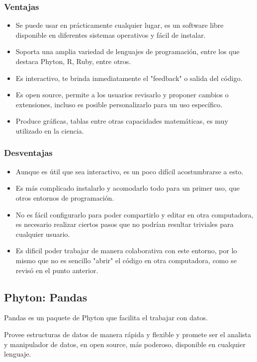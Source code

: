 \documentclass[a4paper]{article}
\begin{document}
\subsubsection{Ventajas}
\begin{itemize}
\item Se puede usar en prácticamente cualquier lugar, es un software libre disponible en diferentes sistemas operativos y fácil de instalar. 
\item Soporta una amplia variedad de lenguajes de programación, entre los que destaca Phyton, R, Ruby, entre otros.
\item Es interactivo, te brinda inmediatamente el "feedback" o salida del código.
\item Es open source, permite a los usuarios revisarlo y proponer cambios o extensiones, incluso es posible personalizarlo para un uso específico.
\item Produce gráficas, tablas entre otras capacidades matemáticas, es muy utilizado en la ciencia.
\end{itemize}

\subsubsection{Desventajas}
\begin{itemize}
\item Aunque es útil que sea interactivo, es un poco difícil acostumbrarse a esto.
\item Es más complicado instalarlo y acomodarlo todo para un primer uso, que otros entornos de programación. 
\item No es fácil configurarlo para poder compartirlo y editar en otra computadora, es necesario realizar ciertos pasos que no podrían resultar triviales para cualquier usuario.
\item Es dificil poder trabajar de manera colaborativa con este entorno, por lo mismo que no es sencillo "abrir" el código en otra computadora, como se revisó en el punto anterior.
\end{itemize}


\subsection{Phyton: Pandas}

Pandas es un paquete de Phyton que facilita el trabajar con datos. 

Provee estructuras de datos de manera rápida y flexible y promete ser el analista y manipulador de datos, en open source, más poderoso, disponible en cualquier lenguaje. 
\end{document}
